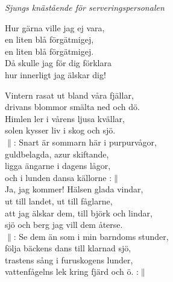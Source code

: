 \documentclass[a6paper,10pt]{article}
\begin{document}
\setlength{\oddsidemargin}{-0.47in}
\noindent
\begin{center}
\small\textit{Sjungs knästående för serveringspersonalen}
\end{center}
\begin{lyrics}
Hur gärna ville jag ej vara,\\
en liten blå förgätmigej,\\
en liten blå förgätmigej.\\
Då skulle jag för dig förklara\\
hur innerligt jag älskar dig!
\end{lyrics}
\vspace{30pt}
\begin{center}
\end{center}
\begin{lyrics}
Vintern rasat ut bland våra fjällar,\\
drivans blommor smälta ned och dö.\\
Himlen ler i vårens ljusa kvällar,\\
solen kysser liv i skog och sjö.
\vspace{5pt}\\
$\|$: Snart är sommarn här i purpurvågor,\\
guldbelagda, azur skiftande,\\
ligga ängarne i dagens lågor,\\
och i lunden dansa källorne :$\|$
\vspace{5pt}\\
Ja, jag kommer! Hälsen glada vindar,\\
ut till landet, ut till fåglarne,\\
att jag älskar dem, till björk och lindar,\\
sjö och berg jag vill dem återse.
\vspace{5pt}\\
$\|$: Se dem än som i min barndoms stunder,\\
följa bäckens dans till klarnad sjö,\\
trastens sång i furuskogens lunder,\\
vattenfågelns lek kring fjärd och ö. :$\|$
\end{lyrics}
\end{document}
